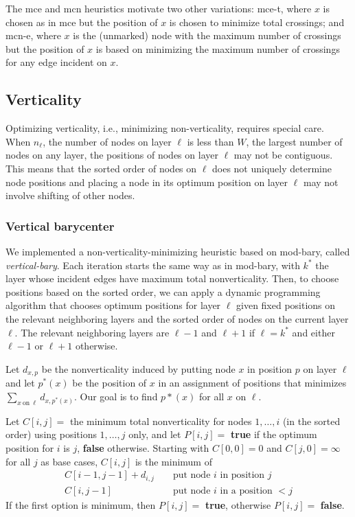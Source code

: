 The mce and mcn heuristics motivate two other variations: mce-t, where $x$ is chosen as in mce but the position of $x$ is chosen to minimize total crossings; and mcn-e, where $x$ is the (unmarked) node with the maximum number of crossings but the position of $x$ is based on minimizing the maximum number of crossings for any edge incident on $x$. 

\subsection{Verticality}

Optimizing verticality, i.e., minimizing non-verticality, requires special care.
When $n_{\ell}$, the number of nodes on layer $\ell$ is less than $W$, the largest number of nodes on any layer, the positions of nodes on layer $\ell$ may not be contiguous.
This means that the sorted order of nodes on $\ell$ does not uniquely determine node positions and placing a node in its optimum position on layer $\ell$ may not involve shifting of other nodes.

\subsubsection{Vertical barycenter}

We implemented a non-verticality-minimizing heuristic based on mod-bary, called \emph{vertical-bary}. Each iteration starts the same way as in mod-bary, with $k^*$ the layer whose incident edges have maximum total nonverticality. Then, to choose positions based on the sorted order, we can apply a dynamic programming algorithm that chooses optimum positions for layer $\ell$ given fixed positions on the relevant neighboring layers and the sorted order of nodes on the current layer $\ell$.
The relevant neighboring layers are $\ell-1$ and $\ell+1$ if $\ell=k^*$ and either $\ell-1$ or $\ell+1$ otherwise.

Let $d_{x,p}$ be the nonverticality induced by putting node $x$ in position $p$ on layer $\ell$ and let $p^*(x)$ be the position of $x$ in an assignment of positions that minimizes $\sum_{x ~\mathrm{on}~ \ell} d_{x,p^*(x)}$. Our goal is to find $p*(x)$ for all $x$ on $\ell$.

Let $C[i,j]=$ the minimum total nonverticality for nodes $1,\ldots,i$ (in the sorted order) using positions $1,\ldots,j$ only, and let $P[i,j] =$ \textbf{true} if the optimum position for $i$ is $j$, \textbf{false} otherwise.
Starting with $C[0,0]=0$ and $C[j,0]=\infty$ for all $j$ as base cases, $C[i,j]$ is the minimum of
\begin{eqnarray*}
C[i-1,j-1] + d_{i,j} && \mbox{ put node } i \mbox{ in position } j
\\
C[i,j-1] && \mbox{ put node } i \mbox{ in a position } < j
\end{eqnarray*}
If the first option is minimum, then $P[i,j] =$ \textbf{true}, otherwise $P[i,j] =$ \textbf{false}.

